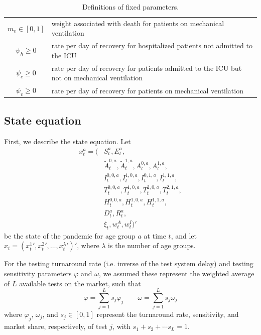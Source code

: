 \documentclass{article}
\begin{document}
\begin{table}[hp!]
\begin{center}
\begin{tabular}{|c|l|}
$m_v \in [0,1]$ & weight associated with death for patients on mechanical ventilation \\
$\psi_h \ge 0$ & rate per day of recovery for hospitalized patients not admitted to the ICU \\
$\psi_c \ge 0$ & rate per day of recovery for patients admitted to the ICU but not on mechanical ventilation \\
$\psi_v \ge 0$ & rate per day of recovery for patients on mechanical ventilation \\
\hline
\end{tabular}
\caption{Definitions of fixed parameters.}
\label{tab:param}
\end{center}
\end{table}

\subsection{State equation \label{sec:state}}

First, we describe the state equation. Let
\begin{align*}
x^a_t = (&S^a_t, E^a_t, \\
 & \tilde{A}^{0,a}_t, \tilde{A}^{1,a}_t, A^{0,a}_t, A^{1,a}_t, \\
 & I^{0,0,a}_t, I^{1,0,a}_t, I^{0,1,a}_t, I^{1,1,a}_t, \\
 & T^{0,0,a}_t, T^{1,0,a}_t, T^{2,0,a}_t, T^{2,1,a}_t, \\
 & H^{0,0,a}_t, H^{1,0,a}_t, H^{1,1,a}_t, \\
 & D^a_t, R^a_t, \\
 & \xi_t, w^A_t, w^I_t)'
\end{align*}
be the state of the pandemic for age group $a$ at time $t$, and let $x_t = ({x^1_t}', {x^2_t}', \dots, {x^\lambda_t}')'$, where $\lambda$ is the number of age groups.

For the testing turnaround rate (i.e. inverse of the test system delay) and testing sensitivity parameters $\varphi$ and $\omega$, we assumed these represent the weighted average of $L$ available tests on the market, such that
\[\varphi = \sum_{j=1}^L s_j \varphi_j \qquad \omega = \sum_{j=1}^L s_j \omega_j\]
where $\varphi_j$, $\omega_j$, and $s_j \in [0,1]$ represent the turnaround rate, sensitivity, and market share, respectively, of test $j$, with $s_1 + s_2 + \dotsm s_L = 1$.
\end{document}

